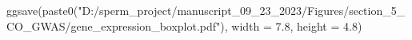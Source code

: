 \documentclass[
  letterpaper,
  DIV=11,
  numbers=noendperiod]{scrreprt}
\newenvironment{Shaded}{\begin{snugshade}}{\end{snugshade}}
\newcommand{\AttributeTok}[1]{\textcolor[rgb]{0.40,0.45,0.13}{#1}}
\newcommand{\FloatTok}[1]{\textcolor[rgb]{0.68,0.00,0.00}{#1}}
\newcommand{\FunctionTok}[1]{\textcolor[rgb]{0.28,0.35,0.67}{#1}}
\newcommand{\NormalTok}[1]{\textcolor[rgb]{0.00,0.23,0.31}{#1}}
\newcommand{\StringTok}[1]{\textcolor[rgb]{0.13,0.47,0.30}{#1}}
\begin{document}
\begin{codelisting}
\begin{Shaded}
\begin{Highlighting}[]
\FunctionTok{ggsave}\NormalTok{(}\FunctionTok{paste0}\NormalTok{(}\StringTok{"D:/sperm\_project/manuscript\_09\_23\_2023/Figures/section\_5\_CO\_GWAS/gene\_expression\_boxplot.pdf"}\NormalTok{), }\AttributeTok{width =} \FloatTok{7.8}\NormalTok{, }\AttributeTok{height =} \FloatTok{4.8}\NormalTok{)  }
\end{Highlighting}
\end{Shaded}

\end{codelisting}
\end{document}
